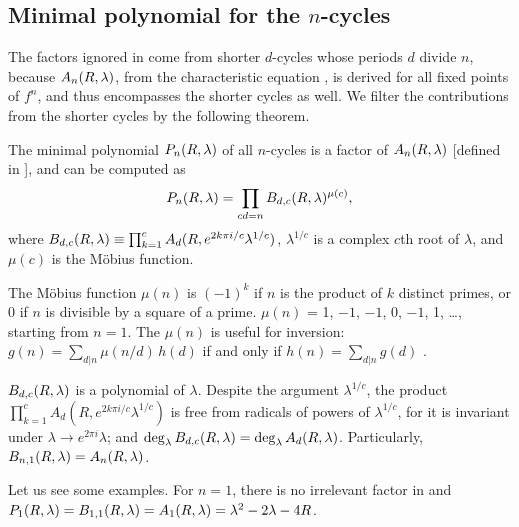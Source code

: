 \documentclass[preprint]{revtex4-1}
\begin{document}
\subsection{\label{sec:primfac}Minimal polynomial for the $n$-cycles}


The factors ignored in 
  come from shorter $d$-cycles whose periods $d$ divide $n$,
%
  because $A_n(R, \lambda)$,
  from the characteristic equation ,
  is derived for all fixed points of $f^n$,
  and thus encompasses the shorter cycles as well.
%
We filter the contributions from the shorter cycles by the following theorem.


\begin{theorem}
  The minimal polynomial $P_n(R, \lambda)$ of all $n$-cycles
  is a factor of $A_n(R, \lambda)$ [defined in ],
  and can be computed as
  \begin{equation}
    P_n(R, \lambda)
    = \prod_{cd = n} B_{d,c}(R, \lambda)^{\mu(c)},
  \label{eq:primfac}
  \end{equation}
where
  $B_{d, c}(R, \lambda) \equiv \prod_{k=1}^c A_{d}(R, e^{2k\pi i/c} \lambda^{1/c})$,
  $\lambda^{1/c}$ is a complex $c$th root of $\lambda$,
  and $\mu(c)$ is the M\"obius function.
  \label{thm:primfac}
\end{theorem}


\begin{remark}[1]
The M\"obius function $\mu(n)$ is $(-1)^k$
  if $n$ is the product of $k$ distinct primes,
  or 0 if $n$ is divisible by a square of a prime.
$\mu(n)$ = 1, $-1$, $-1$, 0, $-1$, 1, \ldots, starting from $n = 1$.
The $\mu(n)$ is useful for inversion:
$g(n) = \sum_{d|n} \mu(n/d) \, h(d)$
if and only if $h(n) = \sum_{d|n} g(d)$
\cite{hardy}.
\end{remark}

\begin{remark}[2]
$B_{d,c}(R, \lambda)$ is a polynomial of $\lambda$.
Despite the argument $\lambda^{1/c}$,
  the product $\prod_{k=1}^c A_d(R, e^{2k\pi i/c} \lambda^{1/c})$
  is free from radicals of powers of $\lambda^{1/c}$,
  for it is invariant under $\lambda \rightarrow e^{2\pi i} \lambda$;
and $\deg_\lambda B_{d,c}(R, \lambda) = \deg_\lambda A_d(R, \lambda)$.
Particularly, $B_{n,1}(R, \lambda) = A_n(R, \lambda)$.
\end{remark}




Let us see some examples.
%
For $n = 1$,
there is no irrelevant factor
in  and
$P_1(R, \lambda) = B_{1,1}(R, \lambda) = A_1(R, \lambda) = \lambda^2 - 2\lambda - 4R$.
\end{document}
